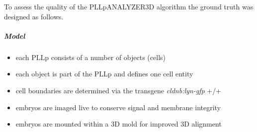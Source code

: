 \documentclass[11pt,singlespacinge,twoside]{reedthesis} %
\providecommand{\tightlist}{%
  \setlength{\itemsep}{0pt}\setlength{\parskip}{0pt}}
\begin{document}
To assess the quality of the PLLpANALYZER3D algorithm the ground truth was designed as follows.

\hypertarget{model-1}{%
\subparagraph{Model}\label{model-1}}
\begin{itemize}
\tightlist
\item
  each PLLp consists of a number of objects (cells)
\item
  each object is part of the PLLp and defines one cell entity
\item
  cell boundaries are determined via the transgene \emph{cldnb:lyn-gfp} +/+
\item
  embryos are imaged live to conserve signal and membrane integrity
\item
  embryos are mounted within a 3D mold for improved 3D alignment
\end{itemize}
\end{document}
